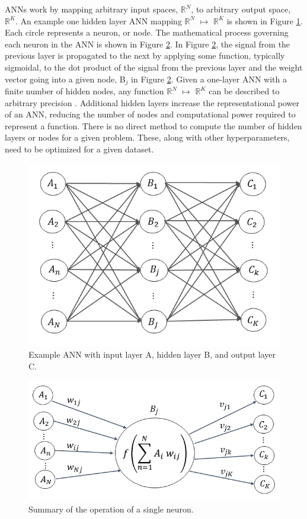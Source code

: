 \documentclass[thesis,tocnosub,noragright,centerchapter,12pt,fullpage]{uiucecethesis09}
\begin{document}
ANNs work by mapping arbitrary input spaces, $\mathbb{R}^N$, to arbitrary output space, $\mathbb{R}^K$. An example one hidden layer ANN mapping $\mathbb{R}^N$ $\mapsto$ $\mathbb{R}^K$ is shown in Figure \ref{fig:Network}. Each circle represents a neuron, or node. The mathematical process governing each neuron in the ANN is shown in Figure \ref{fig:Node}. In Figure \ref{fig:Node}, the signal from the previous layer is propagated to the next by applying some function, typically sigmoidal, to the dot product of the signal from the previous layer and the weight vector going into a given node, B$_{j}$ in Figure \ref{fig:Node}. Given a one-layer ANN with a finite number of hidden nodes, any function $\mathbb{R}^N$ $\mapsto$ $\mathbb{R}^K$ can be described to arbitrary precision \cite{hornik1991}. Additional hidden layers increase the representational power of an ANN, reducing the number of nodes and computational power required to represent a function. There is no direct method to compute the number of hidden layers or nodes for a given problem. These, along with other hyperparameters, need to be optimized for a given dataset.

\begin{figure}
    \centering
    \includegraphics[width=0.5\linewidth]{images/Network}
    \caption{Example ANN with input layer A, hidden layer B, and output layer C.}
    \label{fig:Network}
\end{figure}

\begin{figure}
	\centering
	\includegraphics[width=0.65\linewidth]{images/Node_ABC_2}
	\caption{Summary of the operation of a single neuron.}
	\label{fig:Node}
\end{figure}
\end{document}
